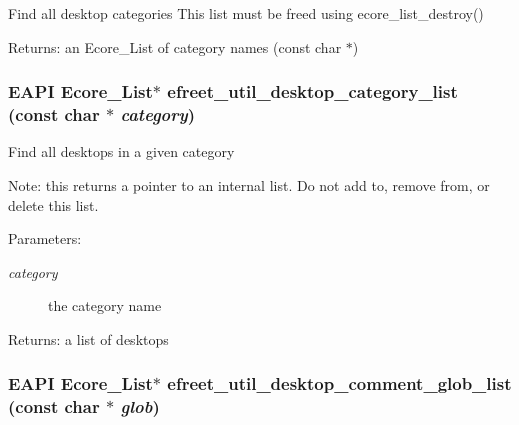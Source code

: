 Find all desktop categories This list must be freed using ecore\_\-list\_\-destroy()

\begin{Desc}
\item[Returns:]an Ecore\_\-List of category names (const char $\ast$) \end{Desc}
\subsubsection[efreet\_\-util\_\-desktop\_\-category\_\-list]{\setlength{\rightskip}{0pt plus 5cm}EAPI Ecore\_\-List$\ast$ efreet\_\-util\_\-desktop\_\-category\_\-list (const char $\ast$ {\em category})}\label{efreet__utils_8c_eea99e97fbede6cceccf6178fd7092e7}


Find all desktops in a given category

Note: this returns a pointer to an internal list. Do not add to, remove from, or delete this list.

\begin{Desc}
\item[Parameters:]
\begin{description}
\item[{\em category}]the category name \end{description}
\end{Desc}
\begin{Desc}
\item[Returns:]a list of desktops \end{Desc}
\subsubsection[efreet\_\-util\_\-desktop\_\-comment\_\-glob\_\-list]{\setlength{\rightskip}{0pt plus 5cm}EAPI Ecore\_\-List$\ast$ efreet\_\-util\_\-desktop\_\-comment\_\-glob\_\-list (const char $\ast$ {\em glob})}\label{efreet__utils_8c_e17d6c23f6e683fd97a60956f0724539}




